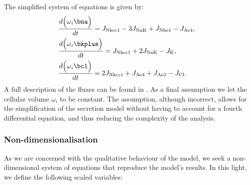 The simplified system of equations is given by:
\begin{align*}
&  \frac{d\Big(\omega{_i} \bna\Big)}{dt}=J_{\text{Nkcc1}}-3J_{\text{NaK}}+J_{\text{Nhe1}}-J_{\text{Ae4}},\\
&  \frac{d\Big(\omega{_i}\bkplus\Big)}{dt}=J_{\text{Nkcc1}}+2J_{\text{NaK}}-J_{\text{K}}, \\
&  \frac{d\Big(\omega{_i} \bcl\Big)}{dt}=2J_{\text{Nkcc1}}+J_{\text{Ae4}}+J_{\text{Ae2}}-J_{\text{Cl}}.
\end{align*}
A full description of the fluxes can be found in \citep{siguenza2017Ae4}. As a final assumption we let the cellular volume $\omega_i$ to be constant. The assumption, although incorrect, allows for the simplification of the secretion model without having to account for a fourth differential equation, and thus reducing the complexity of the analysis.\\

%




\subsubsection*{Non-dimensionalisation}

As we are concerned with the qualitative behaviour of the model, we seek a non-dimensional system of equations that reproduce the model's results. In this light, we define the following scaled variables:

